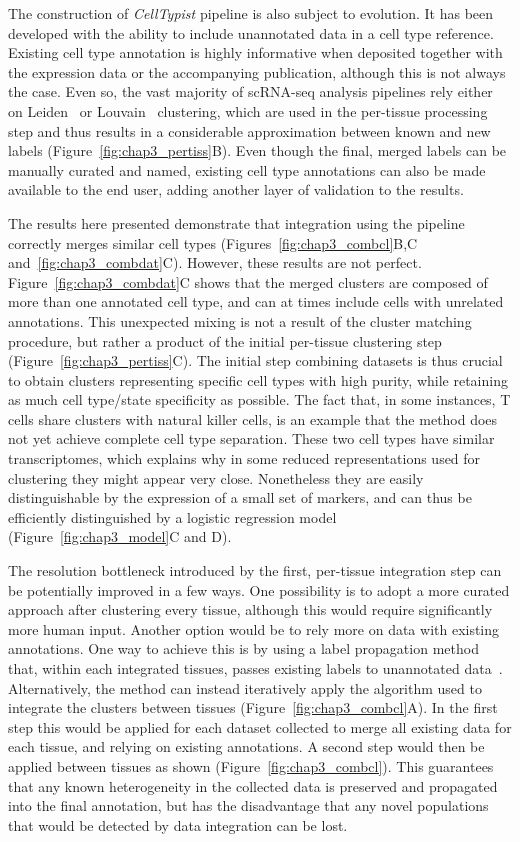 The construction of \textit{CellTypist} pipeline is also subject to evolution. It has been developed with the ability to include unannotated data in a cell type reference. Existing cell type annotation is highly informative when deposited together with the expression data or the accompanying publication, although this is not always the case. Even so, the vast majority of scRNA-seq analysis pipelines rely either on Leiden~\citep{traag_louvain_2019} or Louvain~\citep{blondel_fast_2008} clustering, which are used in the per-tissue processing step and thus results in a considerable approximation between known and new labels (Figure~\ref{fig:chap3_pertiss}B). Even though the final, merged labels can be manually curated and named, existing cell type annotations can also be made available to the end user, adding another layer of validation to the results.

The results here presented demonstrate that integration using the pipeline correctly merges similar cell types (Figures~\ref{fig:chap3_combcl}B,C and~\ref{fig:chap3_combdat}C). However, these results are not perfect. Figure~\ref{fig:chap3_combdat}C shows that the merged clusters are composed of more than one annotated cell type, and can at times include cells with unrelated annotations. This unexpected mixing is not a result of the cluster matching procedure, but rather a product of the initial per-tissue clustering step (Figure~\ref{fig:chap3_pertiss}C). The initial step combining datasets is thus crucial to obtain clusters representing specific cell types with high purity, while retaining as much cell type/state specificity as possible. The fact that, in some instances, T cells share clusters with natural killer cells, is an example that the method does not yet achieve complete cell type separation. These two cell types have similar transcriptomes, which explains why in some reduced representations used for clustering they might appear very close. Nonetheless they are easily distinguishable by the expression of a small set of markers, and can thus be efficiently distinguished by a logistic regression model (Figure~\ref{fig:chap3_model}C and D). 

The resolution bottleneck introduced by the first, per-tissue integration step can be potentially improved in a few ways. One possibility is to adopt a more curated approach after clustering every tissue, although this would require significantly more human input. Another option would be to rely more on data with existing annotations. One way to achieve this is by using a label propagation method that, within each integrated tissues, passes existing labels to unannotated data~\citep{barkas_joint_2019}. Alternatively, the method can instead iteratively apply the algorithm used to integrate the clusters between tissues (Figure~\ref{fig:chap3_combcl}A). In the first step this would be applied for each dataset collected to merge all existing data for each tissue, and relying on existing annotations. A second step would then be applied between tissues as shown (Figure~\ref{fig:chap3_combcl}). This guarantees that any known heterogeneity in the collected data is preserved and propagated into the final annotation, but has the disadvantage that any novel populations that would be detected by data integration can be lost.


